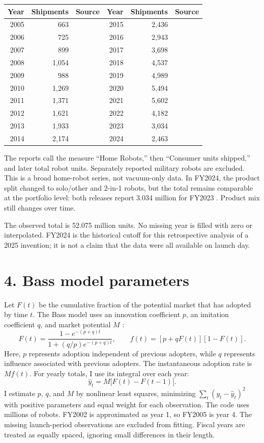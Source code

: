 \documentclass[11pt,a4paper]{article}
\begin{document}
\begin{center}
\begin{tabular}{rrlrrl}
\toprule
Year & Shipments & Source & Year & Shipments & Source \\
\midrule
2005 & 663 & \cite{S05} & 2015 & 2,436 & \cite{S10} \\
2006 & 725 & \cite{S05} & 2016 & 2,943 & \cite{S11} \\
2007 & 899 & \cite{S06} & 2017 & 3,698 & \cite{S11} \\
2008 & 1,054 & \cite{S07} & 2018 & 4,537 & \cite{S12} \\
2009 & 988 & \cite{S07} & 2019 & 4,989 & \cite{S12} \\
2010 & 1,269 & \cite{S08} & 2020 & 5,494 & \cite{S13} \\
2011 & 1,371 & \cite{S08} & 2021 & 5,602 & \cite{S14} \\
2012 & 1,621 & \cite{S09} & 2022 & 4,182 & \cite{S14} \\
2013 & 1,933 & \cite{S09} & 2023 & 3,034 & \cite{S15} \\
2014 & 2,174 & \cite{S10} & 2024 & 2,463 & \cite{S16} \\
\bottomrule
\end{tabular}
\end{center}

The reports call the measure ``Home Robots,'' then ``Consumer units shipped,'' and later total robot units. Separately reported military robots are excluded. This is a broad home-robot series, not vacuum-only data. In FY2024, the product split changed to solo/other and 2-in-1 robots, but the total remains comparable at the portfolio level: both releases report 3.034 million for FY2023 \cite{S15,S16}. Product mix still changes over time.

The observed total is 52.075 million units. No missing year is filled with zero or interpolated. FY2024 is the historical cutoff for this retrospective analysis of a 2025 invention; it is not a claim that the data were all available on launch day.

\section*{4. Bass model parameters}
Let $F(t)$ be the cumulative fraction of the potential market that has adopted by time $t$. The Bass model uses an innovation coefficient $p$, an imitation coefficient $q$, and market potential $M$ \cite{S03}:
\[
F(t)=\frac{1-e^{-(p+q)t}}{1+(q/p)e^{-(p+q)t}},
\qquad f(t)=[p+qF(t)][1-F(t)].
\]
Here, $p$ represents adoption independent of previous adopters, while $q$ represents influence associated with previous adopters. The instantaneous adoption rate is $Mf(t)$. For yearly totals, I use its integral over each year:
\[
\widehat y_t=M\bigl[F(t)-F(t-1)\bigr].
\]
I estimate $p$, $q$, and $M$ by nonlinear least squares, minimizing $\sum_t(y_t-\widehat y_t)^2$ with positive parameters and equal weight for each observation. The code uses millions of robots. FY2002 is approximated as year 1, so FY2005 is year 4. The missing launch-period observations are excluded from fitting. Fiscal years are treated as equally spaced, ignoring small differences in their length.
\end{document}
